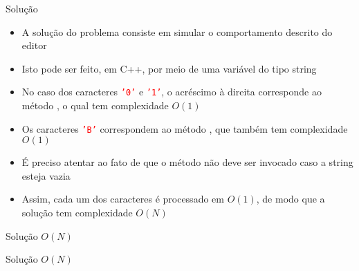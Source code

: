 \begin{frame}[fragile]{Solução}

    \begin{itemize}
        \item A solução do problema consiste em simular o comportamento descrito do editor

        \item Isto pode ser feito, em C++, por meio de uma variável do tipo string

        \item No caso dos caracteres \texttt{\textcolor{red}{'0'}} e \texttt{\textcolor{red}{'1'}},
            o acréscimo à direita corresponde ao método , o qual tem
            complexidade $O(1)$

        \item Os caracteres \texttt{\textcolor{red}{'B'}} correspondem ao método 
            , que também tem complexidade $O(1)$

        \item É preciso atentar ao fato de que o método  não deve ser 
            invocado caso a string esteja vazia

        \item Assim, cada um dos caracteres é processado em $O(1)$, de modo que a solução tem
            complexidade $O(N)$
    \end{itemize}

\end{frame}

\begin{frame}[fragile]{Solução $O(N)$}
\end{frame}

\begin{frame}[fragile]{Solução $O(N)$}
\end{frame}
